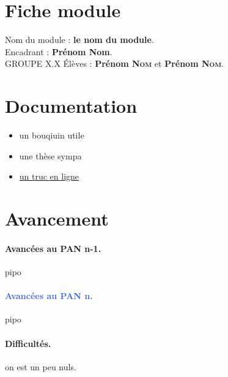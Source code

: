\section{Fiche module}
	\noindent Nom du module : \textbf{le nom du module}.\\
	Encadrant : \textbf{Prénom Nom}. \\

	GROUPE X.X
	Élèves : \textbf{Prénom \textsc{Nom}} et \textbf{Prénom \textsc{Nom}}.

\section{Documentation}

	\begin{itemize}
	\item[\textbullet] un bouqiuin utile
	\item[\textbullet] une thèse sympa
	\item[\textbullet] \url {un truc en ligne}
	\end{itemize}

\section{Avancement} %

	\paragraph*{Avancées au PAN n-1.}
	pipo

	\paragraph*{\textcolor{RoyalBlue}{Avancées au PAN n.}}
	pipo

	\paragraph*{Difficultés.}
	on est un peu nuls.